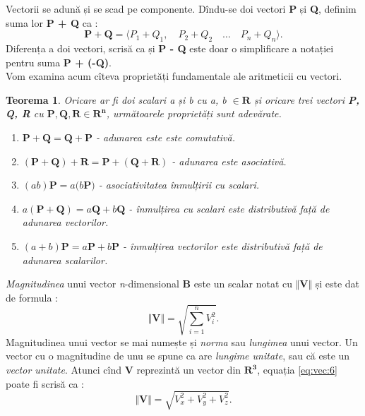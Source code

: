\indent
Vectorii se adună și se scad pe componente. Dîndu-se doi vectori \textbf{P} și
\textbf{Q}, definim suma lor \textbf{P + Q} ca :
\begin{equation}
\label{eq:vec:5}
\mathbf{P + Q} = \langle P_1 + Q_1, \quad P_2 + Q_2 \quad \dots \quad P_n + Q_n
\rangle.
\end{equation}
Diferența a doi vectori, scrisă ca și \textbf{P - Q} este doar o simplificare a
notației pentru suma \textbf{P + (-Q)}.\\
Vom examina acum cîteva proprietăți fundamentale ale aritmeticii cu vectori.

\newtheorem{vector_arith}{Teorema}

\begin{vector_arith}
Oricare ar fi doi scalari \textit{a} și \textit{b} cu \textit{a}, \textit{b}
$\in \mathbf{R}$ și oricare trei vectori \textbf{P, Q, R} cu $\mathbf{P},
\mathbf{Q}, \mathbf{R} \in \mathbf{R^n}$, următoarele proprietăți sunt
adevărate.
\begin{enumerate}
  \item $\mathbf{P + Q = Q + P}$ - adunarea este este comutativă.
  \item $\mathbf{(P + Q) + R = P + (Q + R)}$ - adunarea este asociativă.
  \item $\mathit{(ab)}\mathbf{P} = \mathit{a(b}\mathbf{P}\mathit{)}$ -
  asociativitatea înmulțirii cu scalari.
  \item $\mathit{a(\mathbf{P + Q})} = \mathit{a}\mathbf{Q} +
  \mathit{b}\mathbf{Q}$ - înmulțirea cu scalari este distributivă față de
  adunarea vectorilor.
  \item $\mathit{(a + b)}\mathbf{P} = \mathit{a}\mathbf{P} +
  \mathit{b}\mathbf{P}$ - înmulțirea vectorilor este distributivă față de
  adunarea scalarilor.
\end{enumerate}
\end{vector_arith}

\indent
\textit{Magnitudinea} unui vector \textit{n}-dimensional \textbf{B} este un
scalar notat cu $\Vert \mathbf{V} \Vert$ și este dat de formula :
\begin{equation}
\label{eq:vec:6}
\Vert \mathbf{V} \Vert = \sqrt{\sum_{i = 1}^{n} V_i^2}.
\end{equation}
Magnitudinea unui vector se mai numește și \textit{norma} sau \textit{lungimea}
unui vector. Un vector cu o magnitudine de unu se spune ca are \textit{lungime
unitate}, sau că este un \textit{vector unitate}. Atunci cînd \textbf{V}
reprezintă un vector din $\mathbf{R^3}$, equația \eqref{eq:vec:6} poate fi
scrisă ca :
\begin{equation}
\label{eq:vec:7}
\Vert \mathbf{V} \Vert = \sqrt{V_x^2 + V_y^2 + V_z^2}.
\end{equation}

